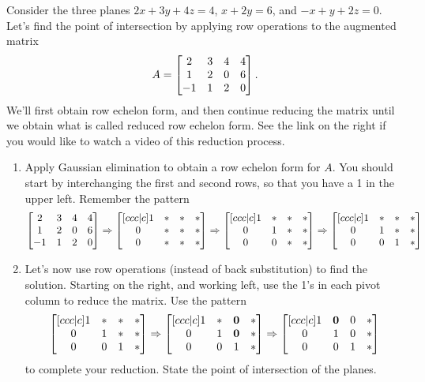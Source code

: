 \begin{problem}
Consider the three planes 
$2x+3y+4z=4$, 
$x+2y=6$, and 
$-x+y+2z=0$. 
Let's find the point of intersection by applying row operations to the augmented matrix
$$
A
=
\begin{bmatrix} 
2&3&4&4\\
1&2&0&6\\
-1&1&2&0
 \end{bmatrix}.$$ We'll first obtain row echelon form, and then continue reducing the matrix until we obtain what is called reduced row echelon form. See the link on the right if you would like to watch a video of this reduction process.
\begin{enumerate}
 \item Apply Gaussian elimination to obtain a row echelon form for $A$. You should start by interchanging the first and second rows, so that you have a 1 in the upper left. Remember the pattern 
$$
\begin{bmatrix} 
2&3&4&4\\
1&2&0&6\\
-1&1&2&0
 \end{bmatrix}
\Rightarrow
\begin{bmatrix} [ccc|c]
1 & * & * & * \\
0 & * & * & * \\
0 & * & * & * \\
 \end{bmatrix}
\Rightarrow
\begin{bmatrix} [ccc|c]
1 & * & * & * \\
0 & 1 & * & * \\
0 & 0 & * & * \\
 \end{bmatrix}
\Rightarrow
\begin{bmatrix} [ccc|c]
1 & * & * & * \\
0 & 1 & * & * \\
0 & 0 & 1 & * \\
 \end{bmatrix}
$$
\item Let's now use row operations (instead of back substitution) to find the solution.  Starting on the right, and working left, use the 1's in each pivot column to reduce the matrix.  Use the pattern 
$$
\begin{bmatrix} [ccc|c]
1 & * & * & * \\
0 & 1 & * & * \\
0 & 0 & 1 & * \\
 \end{bmatrix}
\Rightarrow
\begin{bmatrix} [ccc|c]
1 & * & {\bf 0} & * \\
0 & 1 & {\bf 0} & * \\
0 & 0 & 1 & * \\
 \end{bmatrix}
\Rightarrow
\begin{bmatrix} [ccc|c]
1 & {\bf 0} & 0 & * \\
0 & 1 & 0 & * \\
0 & 0 & 1 & * \\
 \end{bmatrix}
$$
to complete your reduction. State the point of intersection of the planes.
\end{enumerate}
\end{problem}



